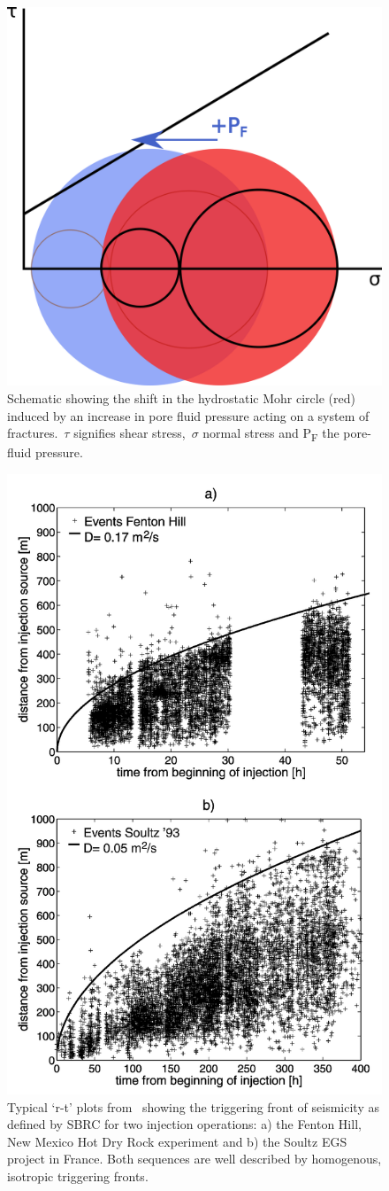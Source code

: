 \begin{figure}[h!]
\begin{center}
\includegraphics[width=0.42\columnwidth]{Chapter_1_Intro/figures/Pf_increase_mohr/Pf_increase_mohr_original}
\caption{{Schematic showing the shift in the hydrostatic Mohr circle (red) induced
by an increase in pore fluid pressure acting on a system of
fractures.~\(\tau\) signifies shear stress,~\(\sigma\)
normal stress and P\textsubscript{F} the pore-fluid pressure.
{\label{469299}}%
}}
\end{center}
\end{figure}
\begin{figure}[h!]
\begin{center}
\includegraphics[width=0.70\columnwidth]{Chapter_1_Intro/figures/Shapiro_2002_SBRC_fig2/Shapiro_2002_SBRC_fig2_original}
\caption{{Typical `r-t' plots from~\protect\citet{Shapiro_2002} showing the triggering front
of seismicity as defined by SBRC for two injection operations: a) the
Fenton Hill, New Mexico Hot Dry Rock experiment and b) the Soultz EGS
project in France. Both sequences are well described by homogenous,
isotropic triggering fronts.
{\label{182804}}%
}}
\end{center}
\end{figure}

